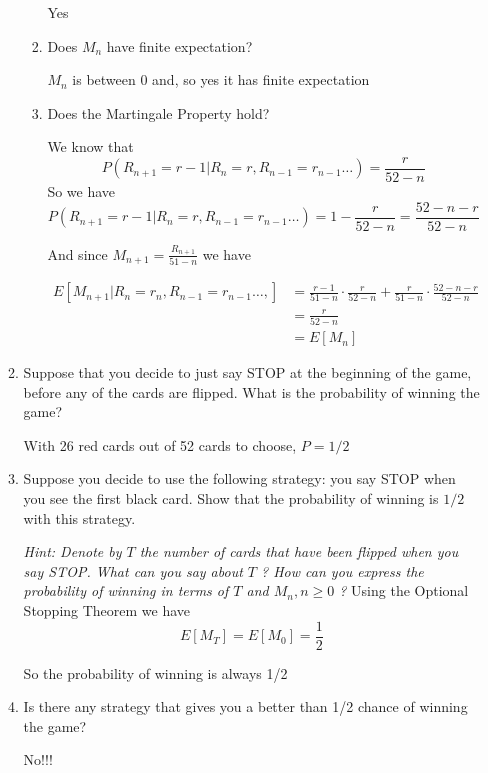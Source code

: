 \documentclass{article} %
\theoremstyle{plain}
\theoremstyle{case}
\begin{document}
\begin{enumerate}[label={\fbox{\textbf{Exercise \#\arabic* :}}}]
\begin{enumerate}
\begin{enumerate}
        Yes
      \item Does $M_n$ have finite expectation?

        $M_n$ is between 0 and, so yes it has finite expectation
      \item Does the Martingale Property hold?

        We know that
        \[ P(R_{n+1} = r-1|R_n=r,R_{n-1}=r_{n-1} \dots) = \frac{r}{52-n}\]
        So we have
        \[ P(R_{n+1} = r-1|R_n=r,R_{n-1}=r_{n-1} \dots) = 1 -  \frac{r}{52-n} = \frac{52-n-r}{52-n} \]

        And since $M_{n+1} = \frac{R_{n+1}}{51-n} $ we have

        \begin{align*}
          E[M_{n+1} | R_n=r_n, R_{n-1} = r_{n-1} \dots, ]
            &= \frac{r-1}{51-n} \cdot \frac{r}{52-n}
            +\frac{r}{51-n} \cdot \frac{52-n-r}{52-n}  \\
            &= \frac{r}{52-n}  \\
            &= E[M_n] 
        \end{align*}
  \end{enumerate}

    \item  Suppose that you decide to just say STOP at the beginning of the game, before any of the cards are flipped. What is the probability of winning the game?

      With 26 red cards out of 52 cards to choose, $P=1/2$
\newpage
    \item  Suppose you decide to use the following strategy: you say STOP when you see the first black card. Show that the probability of winning is $1 / 2$ with this strategy.

      \emph{Hint: Denote by $T$ the number of cards that have been flipped when you say STOP. What can you say about $T$ ? How can you express the probability of winning in terms of $T$ and $M_n, n \geq 0$ ?}
      Using the Optional Stopping Theorem we have
      \[ E[M_T] = E[M_0] = \frac{1}{2}  \]

      So the probability of winning is always 1/2

    \item  Is there any strategy that gives you a better than 1/2 chance of winning the game?

      No!!!
    \end{enumerate}
\end{enumerate}

%
%
\end{document}

